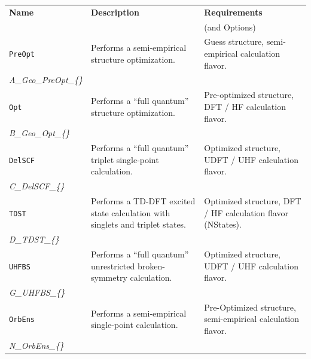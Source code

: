 \documentclass[12pt]{achemso}
\begin{document}
\begin{table}[h!]
    \centering
    \begin{tabular}{p{4cm} | p{8cm} | p{4cm}}
    \hline
    \textbf{Name} &  \textbf{Description}  & \textbf{Requirements}\\
    && (and Options) \\
    \hline
    \hline
    
    \verb+PreOpt+ & Performs a semi-empirical structure optimization. & Guess structure, semi-empirical calculation flavor.\\
    \textit{A\_Geo\_PreOpt\_\{\}}&&\\
    \hline
    
    \verb+Opt+ & Performs a ``full quantum'' structure optimization. & Pre-optimized structure, DFT / HF calculation flavor.\\
    \textit{B\_Geo\_Opt\_\{\}}&&\\
    \hline
    
    \verb+DelSCF+ & Performs a ``full quantum'' triplet single-point calculation. & Optimized structure, UDFT / UHF calculation flavor.\\
    \textit{C\_DelSCF\_\{\}}&&\\
    \hline
    
    \verb+TDST+ & Performs a TD-DFT excited state calculation with singlets and triplet states. & Optimized structure, DFT / HF calculation flavor (NStates).\\
    \textit{D\_TDST\_\{\}}&&\\
    \hline

    \verb+UHFBS+ & Performs a ``full quantum'' unrestricted broken-symmetry calculation. & Optimized structure, UDFT / UHF calculation flavor.\\
    \textit{G\_UHFBS\_\{\}}&&\\
    \hline

    \verb+OrbEns+ & Performs a semi-empirical single-point calculation. & Pre-Optimized structure, semi-empirical calculation flavor.\\
    \textit{N\_OrbEns\_\{\}}&&\\
    \hline

    \end{tabular}
\end{table}
\phantom{nyanyna}
\end{document}
